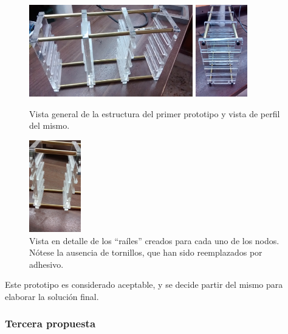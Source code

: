 \begin{figure}[H]
\centering
\includegraphics[width=0.635\textwidth]{Chapter5/Figures/prototipo1vistageneral}
\includegraphics[width=0.2\textwidth]{Chapter5/Figures/prototipo1vistaperfil}
\caption[Vista general del primer prototipo]{Vista general de la estructura del primer prototipo y vista de perfil del mismo.}
\end{figure}

\begin{figure}[H]
\centering
\includegraphics[width=0.2\textwidth]{Chapter5/Figures/prototipo1vistadetalle}
\caption[Vista en detalle de los ``raíles'' del primer prototipo.]{Vista en detalle de los ``raíles'' creados para cada uno de los nodos. Nótese la ausencia de tornillos, que han sido reemplazados por adhesivo.}
\end{figure}

Este prototipo es considerado aceptable, y se decide partir del mismo para elaborar la solución final.

\subsubsection{Tercera propuesta}

